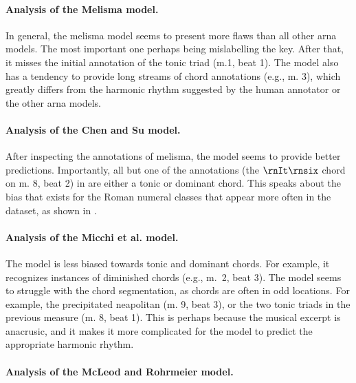 \paragraph{Analysis of the Melisma model.}

In general, the \gls{melisma} model seems to present more
flaws than all other \gls{arna} models. The most important
one perhaps being mislabelling the key. After that, it
misses the initial annotation of the tonic triad (m.1, beat
1). The model also has a tendency to provide long streams of
chord annotations (e.g., m. 3), which greatly differs from
the harmonic rhythm suggested by the human annotator or the
other \gls{arna} models. 

\paragraph{Analysis of the Chen and Su model.}

After inspecting the annotations of \gls{melisma}, the
\textcite{chen2021attend} model seems to provide better
predictions. Importantly, all but one of the annotations
(the $\rnIt\rnsix$ chord on m. 8, beat 2) in
\textcite{chen2021attend} are either a tonic or dominant
chord. This speaks about the bias that exists for the Roman
numeral classes that appear more often in the dataset, as
shown in . 

\paragraph{Analysis of the Micchi et al. model.}

The \textcite{micchi2021deep} model is less biased towards
tonic and dominant chords. For example, it recognizes
instances of diminished chords (e.g., m.~2, beat 3). The
model seems to struggle with the chord segmentation, as
chords are often in odd locations. For example, the
precipitated \gls{neapolitan} (m. 9, beat 3), or the two
tonic triads in the previous measure (m. 8, beat 1). This is
perhaps because the musical excerpt is anacrusic, and it
makes it more complicated for the model to predict the
appropriate harmonic rhythm. 

\paragraph{Analysis of the McLeod and Rohrmeier model.}

